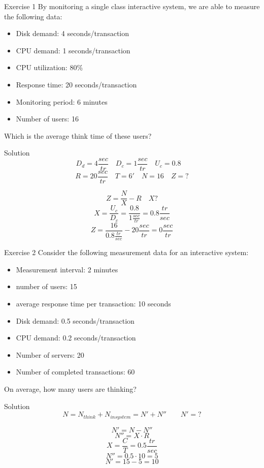 \documentclass[]{beamer}
\begin{document}
\begin{frame}{Exercise 1}
By monitoring a single class interactive system, we are able to measure the following data:
\begin{itemize}
	\item Disk demand: 4 seconds/transaction
	\item CPU demand: 1 seconds/transaction
	\item CPU utilization: 80\%
	\item Response time: 20 seconds/transaction
	\item Monitoring period: 6 minutes
	\item Number of users: 16
\end{itemize}
Which is the average think time of these users?
\end{frame}

\begin{frame}{Solution}
$$D_d = 4 \frac{sec}{tr} \quad D_c = 1 \frac{sec}{tr} \quad U_c = 0.8 \quad$$
$$R = 20 \frac{sec}{tr} \quad T = 6' \quad N = 16 \quad Z=?$$

$$Z = \frac{N}{X} - R \quad X?$$
$$X = \frac{U_c}{D_c} = \frac{0.8}{1\frac{sec}{tr}} = 0.8 \frac{tr}{sec}$$
$$Z = \frac{16}{0.8\frac{tr}{sec}} - 20 \frac{sec}{tr} = 0 \frac{sec}{tr}$$
\end{frame}

\begin{frame}{Exercise 2}
Consider the following measurement data for an interactive system:
\begin{itemize}
	\item Measurement interval: 2 minutes
	\item number of users: 15
	\item average response time per transaction: 10 seconds
	\item Disk demand: 0.5 seconds/transaction
	\item CPU demand: 0.2 seconds/transaction
	\item Number of servers: 20
	\item Number of completed transactions: 60
\end{itemize}
On average, how many users are thinking?
\end{frame}

\begin{frame}{Solution}
$$N = N_{think} + N_{insystem} = N'+N'' \qquad N'=?$$

$$N' = N-N''$$
$$N'' = X\cdot R$$
$$X=\frac{C}{T}=0.5\frac{tr}{sec}$$
$$N''=0.5\cdot 10 = 5$$
$$N' = 15-5 = 10$$
\end{frame}
\end{document}
